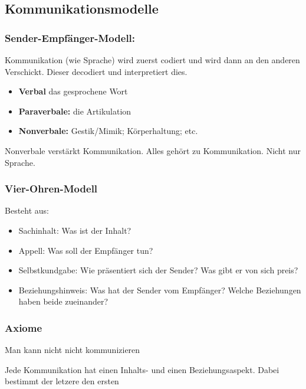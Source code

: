 
\subsection{Kommunikationsmodelle}

\subsubsection{Sender-Empfänger-Modell:}

Kommunikation (wie Sprache) wird zuerst codiert und wird dann an den anderen Verschickt. Dieser decodiert und interpretiert dies.


\begin{itemize}
    \item \textbf{Verbal} das gesprochene Wort
    \item \textbf{Paraverbale:} die Artikulation
    \item \textbf{Nonverbale:} Gestik/Mimik; Körperhaltung; etc.
\end{itemize}

 Nonverbale verstärkt Kommunikation. Alles gehört zu Kommunikation. Nicht nur Sprache.


\subsubsection{Vier-Ohren-Modell}


Besteht aus:
\begin{itemize}
    \item Sachinhalt: Was ist der Inhalt?
    \item Appell: Was soll der Empfänger tun?
    \item Selbstkundgabe: Wie präsentiert sich der Sender? Was gibt er von sich preis?
    \item Beziehungshinweis: Was hat der Sender vom Empfänger? Welche Beziehungen haben beide zueinander?
\end{itemize}

\subsubsection{Axiome}

 Man kann nicht nicht kommunizieren

 Jede Kommunikation hat einen Inhalts- und einen Beziehungsaspekt. Dabei bestimmt der letzere den ersten

